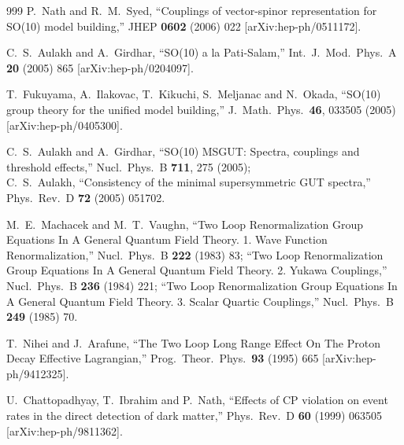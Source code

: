 \begin{thebibliography}{999}
  P.~Nath and R.~M.~Syed,
  ``Couplings of vector-spinor representation for SO(10) model building,''
  JHEP {\bf 0602} (2006) 022
  [arXiv:hep-ph/0511172].


  C.~S.~Aulakh and A.~Girdhar,
  ``SO(10) a la Pati-Salam,''
  Int.\ J.\ Mod.\ Phys.\ A {\bf 20} (2005) 865
  [arXiv:hep-ph/0204097].

T.~Fukuyama, A.~Ilakovac, T.~Kikuchi, S.~Meljanac and N.~Okada,
  ``SO(10) group theory for the unified model building,''
  J.\ Math.\ Phys.\  {\bf 46}, 033505 (2005)
  [arXiv:hep-ph/0405300].

   C.~S.~Aulakh and A.~Girdhar,
  ``SO(10) MSGUT: Spectra, couplings and threshold effects,''
  Nucl.\ Phys.\ B {\bf 711}, 275 (2005);\\
 C.~S.~Aulakh,
  ``Consistency of the minimal supersymmetric GUT spectra,''
  Phys.\ Rev.\ D {\bf 72} (2005) 051702.

  M.~E.~Machacek and M.~T.~Vaughn,
  ``Two Loop Renormalization Group Equations In A General Quantum Field Theory.
  1. Wave Function Renormalization,''
  Nucl.\ Phys.\ B {\bf 222} (1983) 83;
  ``Two Loop Renormalization Group Equations In A General Quantum Field Theory.
  2. Yukawa Couplings,''
  Nucl.\ Phys.\ B {\bf 236} (1984) 221;
  ``Two Loop Renormalization Group Equations In A General Quantum Field Theory.
  3. Scalar Quartic Couplings,''
  Nucl.\ Phys.\ B {\bf 249} (1985) 70.

  T.~Nihei and J.~Arafune,
  ``The Two Loop Long Range Effect On The Proton Decay Effective Lagrangian,''
  Prog.\ Theor.\ Phys.\  {\bf 93} (1995) 665
  [arXiv:hep-ph/9412325].

  U.~Chattopadhyay, T.~Ibrahim and P.~Nath,
   ``Effects of CP violation on event rates in the direct detection of dark
  matter,''
  Phys.\ Rev.\ D {\bf 60} (1999) 063505
  [arXiv:hep-ph/9811362].


\end{thebibliography}
